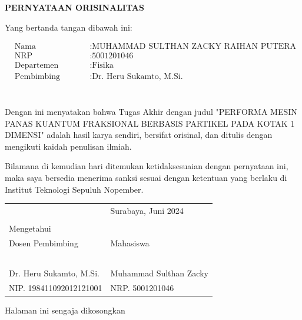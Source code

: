 \begin{center}
	\large
	\textbf{PERNYATAAN ORISINALITAS}
\end{center}


\vspace{2ex}


\noindent Yang bertanda tangan dibawah ini:

\begin{minipage}{5cm}
	\begin{align*}
		&\text{Nama} \qquad &&: \text{MUHAMMAD SULTHAN ZACKY RAIHAN PUTERA HASAN} \\
		&\text{NRP} \qquad &&: \text{5001201046} \\
		&\text{Departemen} \qquad &&: \text{Fisika} \\
		&\text{Pembimbing} \qquad &&: \text{Dr. Heru Sukamto, M.Si.} \\
	\end{align*}
\end{minipage} \\

Dengan ini menyatakan bahwa Tugas Akhir dengan judul "PERFORMA MESIN PANAS KUANTUM FRAKSIONAL BERBASIS PARTIKEL PADA KOTAK 1 DIMENSI" adalah hasil karya sendiri, bersifat orisinal, dan ditulis dengan mengikuti kaidah penulisan ilmiah.

Bilamana di kemudian hari ditemukan ketidaksesuaian dengan pernyataan ini, maka saya bersedia menerima sanksi sesuai dengan ketentuan yang berlaku di Institut Teknologi Sepuluh Nopember.

\vspace{8ex}

\noindent\begin{tabularx}{\textwidth}{X l}
	& Surabaya, Juni 2024\\
	& \\
	Mengetahui & \\
	Dosen Pembimbing & Mahasiswa\\
	& \\
	& \\
	& \\
	& \\
	& \\
	Dr. Heru Sukamto, M.Si. & Muhammad Sulthan Zacky \\
	NIP. 198411092012121001 & NRP. 5001201046\\
\end{tabularx}

\newpage
\thispagestyle{empty}
\vspace*{\fill}
    \begin{center}
	Halaman ini sengaja dikosongkan
    \end{center}
\vspace*{\fill}
\pagebreak
